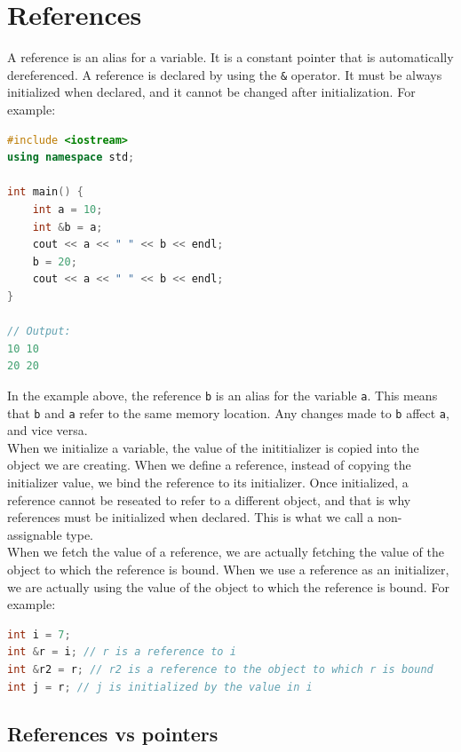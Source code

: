 \section{References}

A reference is an alias for a variable. It is a constant pointer that is
automatically dereferenced. A reference is declared by using the \texttt{\&}
operator. It must be always initialized when declared, and it cannot be changed
after initialization. For example:\\

\begin{lstlisting}[language=C++]
#include <iostream>
using namespace std;

int main() {
    int a = 10;
    int &b = a;
    cout << a << " " << b << endl;
    b = 20;
    cout << a << " " << b << endl;
}

// Output:
10 10
20 20
\end{lstlisting}

In the example above, the reference \texttt{b} is an alias for the variable
\texttt{a}. This means that \texttt{b} and \texttt{a} refer to the same memory
location. Any changes made to \texttt{b} affect \texttt{a}, and vice versa.\\

When we initialize a variable, the value of the inititializer is copied into
the object we are creating. When we define a reference, instead of copying
the initializer value, we bind the reference to its initializer. Once initialized,
a reference cannot be reseated to refer to a different object, and that is why
references must be initialized when declared. This is what we call a non-assignable
type.\\

When we fetch the value of a reference, we are actually fetching the value of
the object to which the reference is bound. When we use a reference as an
initializer, we are actually using the value of the object to which the reference
is bound. For example:\\

\begin{lstlisting}[language=C++]
int i = 7;
int &r = i; // r is a reference to i
int &r2 = r; // r2 is a reference to the object to which r is bound
int j = r; // j is initialized by the value in i
\end{lstlisting}

\subsection{References vs pointers}

